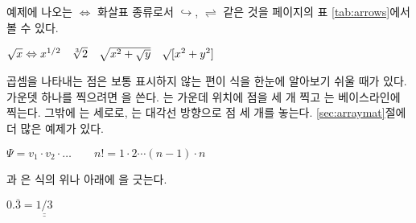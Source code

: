 \noindent 예제에 나오는 $\Leftrightarrow$ 화살표 종류로서 $\hookrightarrow$, $\rightleftharpoons$ 같은 것을 \pageref{tab:arrows}페이지의 표 \ref{tab:arrows}에서 볼 수 있다.
\begin{example}
$\sqrt{x} \Leftrightarrow x^{1/2}
 \quad \sqrt[3]{2}
 \quad \sqrt{x^{2} + \sqrt{y}}
 \quad \surd[x^2 + y^2]$
\end{example}

곱셈을 나타내는 점은 보통 표시하지 않는 편이 식을 한눈에 알아보기 쉬울 때가 있다.
가운뎃 하나를 찍으려면 을 쓴다. 는 가운데 위치에 점을 세 개 찍고 
는 베이스라인에 찍는다.
그밖에 는 세로로, 는 대각선 방향으로 점 세 개를 놓는다. \ref{sec:arraymat}절에 더 많은 예제가 있다.
\begin{example}
$\Psi = v_1 \cdot v_2
 \cdot \ldots \qquad 
 n! = 1 \cdot 2 
 \cdots (n-1) \cdot n$
\end{example}

과 은 식의 위나 아래에 을 긋는다.
 
\begin{example}
$0.\overline{3} = 
 \underline{\underline{1/3}}$
\end{example}

